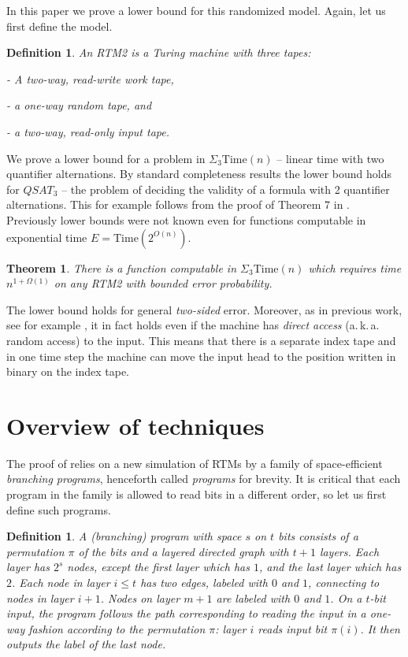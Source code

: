 \documentclass{toc}
\newtheorem{thm}[theorem]{Theorem}
\newtheorem{defn}[theorem]{Definition}
\newcommand{\Timee}{\mathrm{Time}}   %
\begin{document}
In this paper we prove a lower bound for this randomized model. Again,
let us first define the model.
\begin{defn}
An RTM2 is a Turing machine with three tapes:

- A two-way, read-write work tape,

- a one-way random tape, and

- a two-way, read-only input tape.
\end{defn}

We prove a lower bound for a problem in $\Sigma_{3}\Timee(n)$ -- linear
time with two quantifier alternations. By standard completeness results
the lower bound holds for $QSAT_{3}$ -- the problem of deciding
the validity of a formula with 2 quantifier alternations. This for
example follows from the proof of Theorem 7 in \cite{DvM06}. Previously
lower bounds were not known even for functions computable in exponential
time $E=\Timee(2^{O(n)})$.

%
\begin{thm}
\label{thm:RTM2-lb}There is a function computable in $\Sigma_{3}\Timee(n)$
which requires time $n^{1+\Omega(1)}$ on any RTM2 with bounded error
probability.
\end{thm}

The lower bound holds for general \emph{two-sided} error. Moreover,
as in previous work, see for example \cite{DBLP:journals/tcs/MelkebeekR05},
it in fact holds even if the machine has \emph{direct access}
(a.\,k.\,a.   %
random access) to the input. This means that there is a separate index
tape and in one time step the machine can move the input head to the
position written in binary on the index tape.

\section{Overview of techniques \label{sec:Overview-of-techniques}}

The proof of  relies on a new simulation of
RTMs by a family of space-efficient \emph{branching programs}, henceforth
called \emph{programs} for brevity. It is critical that each program
in the family is allowed to read bits in a different order, so let
us first define such programs.
\begin{defn}
A \emph{(branching) program }with space $s$ on $t$ bits consists
of a permutation $\pi$ of the bits and a layered directed graph with
$t+1$ layers. Each layer has $2^{s}$ nodes, except the first layer
which has $1$, and the last layer which has $2$. Each node in layer
$i\le t$ has two edges, labeled with $0$ and $1$, connecting to
nodes in layer $i+1$. Nodes on layer $m+1$ are labeled with $0$
and $1$. On a $t$-bit input, the program follows the path corresponding
to reading the input in a one-way fashion according to the permutation
$\pi$: layer $i$ reads input bit $\pi(i)$. It then outputs the
label of the last node.
\end{defn}
\end{document}
